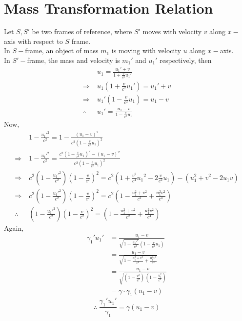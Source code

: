 \documentclass[../main-sheet.tex]{subfiles}
\begin{document}
\section{Mass Transformation Relation}
Let \(S,S'\) be two frames of reference, where \(S' \) moves with velocity \(v \) along \(x-\)axis with respect to \(S \) frame.\\
In \(S-\)frame, an object of mass \(m_1\) is moving with velocity \(u\) along \(x-\)axis.\\
In \(S'-\)frame, the mass and velocity is \(m_1'\) and \(u_1'\) respectively, then
\begin{align*}
    & u_1=\frac{u_1'+v}{1+\frac{v }{c^2 }u_1'}\\
    \Rightarrow\;& u_1\left({1+\frac{v }{c^2 }u_1'}\right)={u_1'+v}\\
    \Rightarrow\;& u_1'\left({1-\frac{v }{c^2 }u_1}\right)={u_1-v}\\
    \therefore\;& u_1'=\frac{u_1-v}{1-\frac{v }{c^2 }u_1}
\end{align*}
Now,
\begin{align*}
    &1-\frac{{u_1'}^2}{c^2}=1-\frac{(u_1-v)^2}{c^2\left(1-\frac{v }{c^2 }u_1\right)^2}\\
    \Rightarrow\;&1-\frac{{u_1'}^2}{c^2}=\frac{c^2\left(1-\frac{v }{c^2 }u_1\right)^2- (u_1-v)^2}{c^2\left(1-\frac{v }{c^2 }u_1\right)^2}\\
    \Rightarrow\;&c^2\left(1-\frac{{u_1'}^2}{c^2}\right)\left(1-\frac{v }{c^2}\right)^2=c^2\left(1+\frac{v^2 }{c^4}{u_1}^2-2\frac{v }{c^2}u_1\right)-(u_1^2+v^2-2u_1v)\\
    \Rightarrow\;&c^2\left(1-\frac{{u_1'}^2}{c^2}\right)\left(1-\frac{v }{c^2}\right)^2=c^2\left(1-\frac{u_1^2+v^2 }{c^2}+\frac{u_1^2 v^2 }{c^4}\right)\\
    \therefore\;&\left(1-\frac{{u_1'}^2}{c^2}\right)\left(1-\frac{v }{c^2}\right)^2=\left(1-\frac{u_1^2+v^2 }{c^2}+\frac{u_1^2 v^2 }{c^4}\right)
\end{align*}
Again,
\begin{align*}
    \gamma_1'u_1'&=\frac{u_1-v}{\sqrt{1-\frac{{u_1'}^2}{c^2}}\left(1-\frac{v }{c^2}u_1\right)}\\
    &=\frac{u_1-v}{\sqrt{1-\frac{u_1^2+v^2 }{c^2}+\frac{u_1^2 v^2 }{c^4}}}\\
    &=\frac{u_1-v}{\sqrt{\left(1-\frac{v^2 }{c^2}\right)\,\left(1-\frac{u_1^2}{c^2}\right)}}\\
    &=\gamma\cdot\gamma_1(u_1-v)
\end{align*}
\begin{equation}
    \therefore\;\frac{\gamma_1'u_1'}{\gamma_1}=\gamma(u_1-v ) \label{eq:mass1}
\end{equation}
\end{document}
